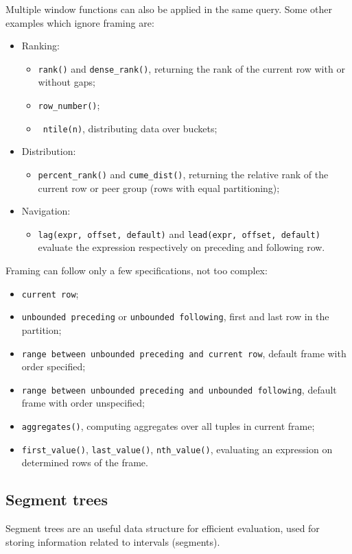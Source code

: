 Multiple window functions can also be applied in the same query. Some other examples which ignore framing are:
\begin{itemize}
	\item Ranking:
	\begin{itemize}
		\item \texttt{rank()} and \texttt{dense\_rank()}, returning the rank of the current row with or without gaps;
		\item \texttt{row\_number()};
		\item\texttt{ ntile(n)}, distributing data over buckets;
	\end{itemize}
	\item Distribution:
	\begin{itemize}
		\item \texttt{percent\_rank()} and \texttt{cume\_dist()}, returning the relative rank of the current row or peer group (rows with equal partitioning);
	\end{itemize}
	\item Navigation:
	\begin{itemize}
		\item \texttt{lag(expr, offset, default)} and \texttt{lead(expr, offset, default)} evaluate the expression respectively on preceding and following row.
	\end{itemize}
\end{itemize}

Framing can follow only a few specifications, not too complex:
\begin{itemize}
	\item \texttt{current row};
	\item \texttt{unbounded preceding} or \texttt{unbounded following}, first and last row in the partition;
	\item \texttt{range between unbounded preceding and current row}, default frame with order specified;
	\item \texttt{range between unbounded preceding and unbounded following}, default frame with order unspecified;
	\item \texttt{aggregates()}, computing aggregates over all tuples in current frame;
	\item \texttt{first\_value()}, \texttt{last\_value()}, \texttt{nth\_value()}, evaluating an expression on determined rows of the frame.
\end{itemize}

\subsection{Segment trees}
Segment trees are an useful data structure for efficient evaluation, used for storing information related to intervals (segments).

